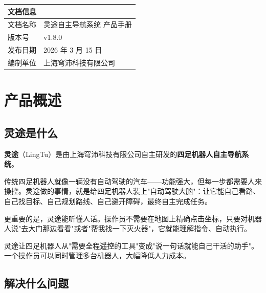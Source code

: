 \documentclass[a4paper, 12pt, openany]{book}
\begin{document}
\thispagestyle{empty}
\vspace*{\fill}
\begin{center}
\begin{tabular}{ll}
  \toprule
  \textbf{文档信息} & \\
  \midrule
  文档名称 & 灵途自主导航系统 产品手册 \\
  版本号 & v1.8.0 \\
  发布日期 & 2026 年 3 月 15 日 \\
  编制单位 & 上海穹沛科技有限公司 \\
  \bottomrule
\end{tabular}
\end{center}
\vspace*{\fill}
\clearpage

\tableofcontents
\clearpage


\chapter{产品概述}

\section{灵途是什么}

\textbf{灵途}（LingTu）是由上海穹沛科技有限公司自主研发的\textbf{四足机器人自主导航系统}。

传统四足机器人就像一辆没有自动驾驶的汽车——功能强大，但每一步都需要人来操控。灵途做的事情，就是给四足机器人装上"自动驾驶大脑"：让它能自己看路、自己找目标、自己规划路线、自己避开障碍，最终自主完成任务。

更重要的是，灵途能听懂人话。操作员不需要在地图上精确点击坐标，只要对机器人说"去大门那边看看"或者"帮我找一下灭火器"，它就能理解指令、自动执行。

\begin{infobox}[一句话总结]
灵途让四足机器人从"需要全程遥控的工具"变成"说一句话就能自己干活的助手"。一个操作员可以同时管理多台机器人，大幅降低人力成本。
\end{infobox}

\section{解决什么问题}
\end{document}
